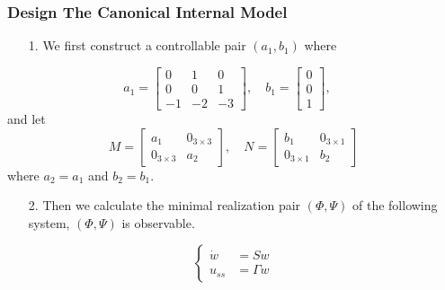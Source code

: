 \documentclass{beamer}
\begin{document}
\begin{frame}[fragile]
    \frametitle{{\color{red} Design The Canonical Internal Model}}
    \begin{enumerate}
      \item [1.] {\color{blue}We first construct a controllable pair $(a_{1},b_{1})$ where}
    \end{enumerate}
\begin{equation}\label{controllable-pair}\nonumber
  a_{1}=\left[\begin{matrix}
                0 & 1 & 0 \\
                0 & 0 & 1 \\
                -1 & -2 & -3
              \end{matrix}\right], \quad
  b_{1}=\left[\begin{matrix}
                0 \\
                0 \\
                1
              \end{matrix}\right], \quad
\end{equation}
and let
\begin{equation}\label{M1N1}\nonumber
    M = \left[\begin{matrix}
                    a_{1} & 0_{3\times 3} \\
                    0_{3\times 3} & a_{2}
                  \end{matrix}\right],\quad
    N = \left[\begin{matrix}
                b_{1} & 0_{3\times 1} \\
                0_{3\times 1} & b_{2}
              \end{matrix}\right]
\end{equation}
where $a_{2}=a_{1}$ and $b_{2}=b_{1}$.

\begin{enumerate}
      \item [2.] {\color{blue}Then we calculate the minimal realization pair $(\Phi, \Psi)$ of the following system, $(\Phi, \Psi)$ is observable.}
    \end{enumerate}
    \begin{equation}\label{exosystem}\left\{
      \begin{aligned}
        \dot{w} &= Sw \\
        u_{ss} &= \Gamma w
      \end{aligned}\right.
\end{equation}
\end{frame}
\end{document}
